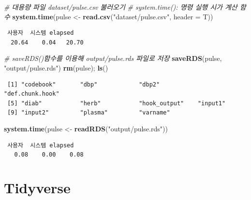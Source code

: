 \documentclass[
  11pt,
]{krantz}
\newenvironment{Shaded}{\begin{snugshade}}{\end{snugshade}}
\newcommand{\CommentTok}[1]{\textcolor[rgb]{0.37,0.37,0.37}{\textit{#1}}}
\newcommand{\DataTypeTok}[1]{\textcolor[rgb]{0.27,0.27,0.27}{#1}}
\newcommand{\KeywordTok}[1]{\textcolor[rgb]{0.27,0.27,0.27}{\textbf{#1}}}
\newcommand{\NormalTok}[1]{#1}
\newcommand{\StringTok}[1]{\textcolor[rgb]{0.5,0.5,0.5}{#1}}
\begin{document}
\footnotesize

\begin{Shaded}
\begin{Highlighting}[]
\CommentTok{# 대용량 파일 dataset/pulse.csv 불러오기}
\CommentTok{# system.time(): 명령 실행 시가 계산 함수}
\KeywordTok{system.time}\NormalTok{(pulse <-}\StringTok{ }\KeywordTok{read.csv}\NormalTok{(}\StringTok{"dataset/pulse.csv"}\NormalTok{, }\DataTypeTok{header =}\NormalTok{ T))}
\end{Highlighting}
\end{Shaded}

\begin{verbatim}
 사용자  시스템 elapsed 
  20.64    0.04   20.70 
\end{verbatim}

\begin{Shaded}
\begin{Highlighting}[]
\CommentTok{# saveRDS()함수를 이용해 output/pulse.rds 파일로 저장}
\KeywordTok{saveRDS}\NormalTok{(pulse, }\StringTok{"output/pulse.rds"}\NormalTok{)}
\KeywordTok{rm}\NormalTok{(pulse); }\KeywordTok{ls}\NormalTok{()}
\end{Highlighting}
\end{Shaded}

\begin{verbatim}
 [1] "codebook"       "dbp"            "dbp2"           "def.chunk.hook"
 [5] "diab"           "herb"           "hook_output"    "input1"        
 [9] "input2"         "plasma"         "varname"       
\end{verbatim}

\begin{Shaded}
\begin{Highlighting}[]
\KeywordTok{system.time}\NormalTok{(pulse <-}\StringTok{ }\KeywordTok{readRDS}\NormalTok{(}\StringTok{"output/pulse.rds"}\NormalTok{))}
\end{Highlighting}
\end{Shaded}

\begin{verbatim}
 사용자  시스템 elapsed 
   0.08    0.00    0.08 
\end{verbatim}

\normalsize

\hypertarget{tidyverse}{%
\section{Tidyverse}\label{tidyverse}}
\end{document}
